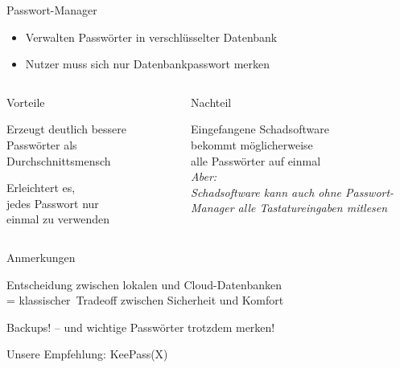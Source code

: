 \begin{frame}{Passwort-Manager}
  \begin{itemize}
    \item Verwalten Passwörter in verschlüsselter Datenbank
    \item Nutzer muss sich nur Datenbankpasswort merken
  \end{itemize}

  \begin{columns}[T]
    \begin{column}{.45\textwidth}
      \pause
      \begin{blit}{Vorteile}
        \small
        \item Erzeugt deutlich bessere Passwörter als Durchschnittsmensch
        \item Erleichtert es,\\jedes Passwort nur\\einmal zu verwenden
      \end{blit}
    \end{column}
    \begin{column}{.55\textwidth}
      \pause
      \begin{blit}{Nachteil}
        \small
        \item Eingefangene Schadsoftware\\bekommt möglicherweise\\alle Passwörter auf einmal\\
          \emph{Aber:\\ Schadsoftware kann auch ohne Passwort-Manager alle Tastatureingaben mitlesen}
      \end{blit}
    \end{column}
  \end{columns}
  \pause
  \begin{blit}{Anmerkungen}
    \small
    \item Entscheidung zwischen lokalen und \glqq Cloud\grqq -Datenbanken\\ = \glqq klassischer\grqq\ Tradeoff zwischen Sicherheit und Komfort
    \item Backups! -- und wichtige Passwörter trotzdem merken!
    \item Unsere Empfehlung: KeePass(X)
  \end{blit}
\end{frame}

\endinput
